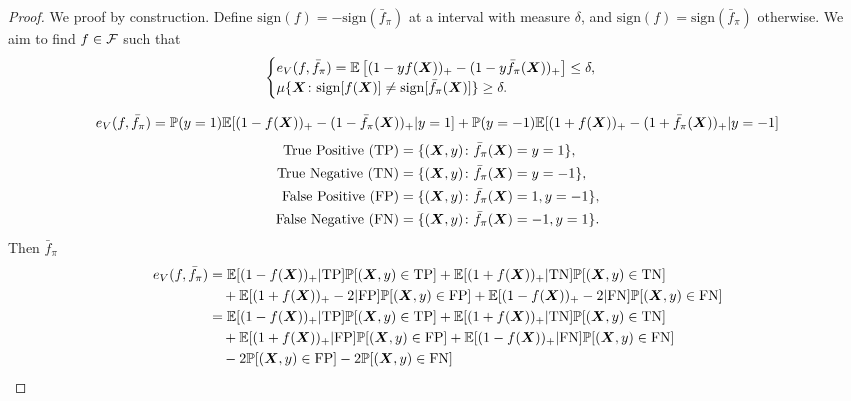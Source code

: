 \documentclass[11pt]{article}
\theoremstyle{plain}
\theoremstyle{definition}
\begin{document}
\begin{proof}
We proof by construction. Define $\text{sign}(f)=-\text{sign}(\bar f_\pi)$ at a interval with measure $\delta$, and $\text{sign}(f)=\text{sign}(\bar f_\pi)$ otherwise. We aim to find $f\in\mathcal{F}$ such that
\[
\begin{cases}
e_V(f,\bar f_\pi) = \mathbb{E}\left[(1-yf(\bm X))_{+}-(1-y\bar f_\pi(\bm X))_{+}\right]\leq \delta,\\
\mu\{\bm X\colon \text{sign}[f(\bm X)] \neq \text{sign}[\bar f_\pi(\bm X)]\}\geq \delta.
\end{cases}
\]

\begin{align}
e_V(f,\bar f_\pi) &= \mathbb{P}(y=1)\mathbb{E}[(1-f(\bm X))_{+}-(1-\bar f_\pi(\bm X))_{+} | y=1]+ \mathbb{P}(y=-1)\mathbb{E}[(1+f(\bm X))_{+}-(1+\bar f_\pi(\bm X))_{+} | y=-1]\\
\end{align}
\begin{align}
\text{True Positive (TP)}&=\{ (\bm X,y)\colon \bar f_\pi(\bm X)=y=1 \},\\
\text{True Negative (TN)}&=\{ (\bm X,y)\colon \bar f_\pi(\bm X)=y=-1 \},\\
\text{False Positive (FP)}&=\{ (\bm X,y)\colon \bar f_\pi(\bm X)=1,y=-1 \},\\
\text{False Negative (FN)}&=\{ (\bm X,y)\colon \bar f_\pi(\bm X)=-1,y=1 \}.
\end{align}
Then $\bar f_\pi$
\begin{align}
e_V(f,\bar f_\pi) 
&= \mathbb{E}[(1-f(\bm X))_{+}|\text{TP}] \mathbb{P}[(\bm X,y)\in \text{TP}]+ \mathbb{E}[(1+f(\bm X))_{+}|\text{TN}]\mathbb{P}[(\bm X,y)\in \text{TN}]\\
&\quad +\mathbb{E}[(1+f(\bm X))_{+}-2|\text{FP}]\mathbb{P}[(\bm X,y)\in \text{FP}]+\mathbb{E}[(1-f(\bm X))_{+}-2|\text{FN}]\mathbb{P}[(\bm X,y)\in \text{FN}]\\
&= \mathbb{E}[(1-f(\bm X))_{+}|\text{TP}] \mathbb{P}[(\bm X,y)\in \text{TP}]+ \mathbb{E}[(1+f(\bm X))_{+}|\text{TN}]\mathbb{P}[(\bm X,y)\in \text{TN}]\\
&\quad +\mathbb{E}[(1+f(\bm X))_{+}|\text{FP}]\mathbb{P}[(\bm X,y)\in \text{FP}]+\mathbb{E}[(1-f(\bm X))_{+}|\text{FN}]\mathbb{P}[(\bm X,y)\in \text{FN}] \\
&\quad - 2\mathbb{P}[(\bm X,y)\in \text{FP}]-2\mathbb{P}[(\bm X,y)\in\text{FN}]
\end{align}


\end{proof}
\end{document}

